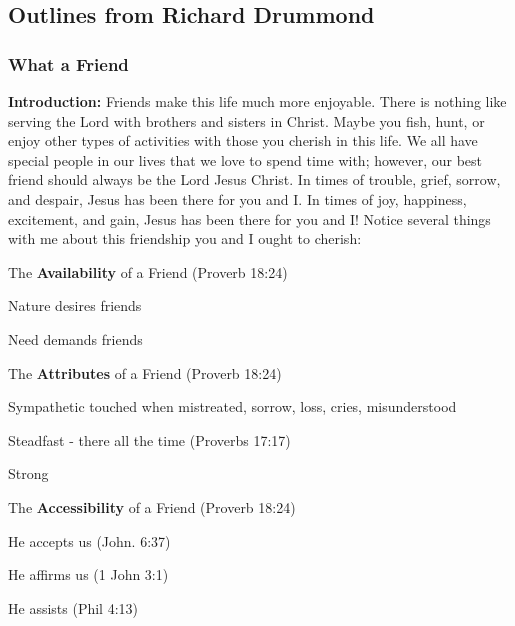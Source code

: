 \subsection{Outlines from Richard Drummond}

\subsubsection{What a Friend}


\noindent \textbf{Introduction: } Friends make this life much more enjoyable. There is nothing like serving the Lord with brothers and sisters in Christ. Maybe you fish, hunt, or enjoy other types of activities with those you cherish in this life. We all have special people in our lives that we love to spend time with; however, our best friend should always be the Lord Jesus Christ. In times of trouble, grief, sorrow, and despair, Jesus has been there for you and I. In times of joy, happiness, excitement, and gain, Jesus has been there for you and I!
Notice several things with me about this friendship you and I ought to cherish:
%
\begin{compactenum}[I.]
    \item The \textbf{Availability} of a Friend (Proverb 18:24)
    \begin{compactenum}[A.]
    	\item Nature desires friends
    	\item Need demands friends
    \end{compactenum}
    \item The \textbf{Attributes} of a Friend (Proverb 18:24)
    \begin{compactenum}[A.]
    	\item Sympathetic touched when mistreated, sorrow, loss, cries, misunderstood
    	\item Steadfast - there all the time  (Proverbs 17:17)
    	\item Strong
    \end{compactenum}
    \item The \textbf{Accessibility} of a Friend (Proverb 18:24)    \begin{compactenum}[A.]
    	\item He accepts us  (John. 6:37)
    	\item He affirms us  (1 John 3:1)
    	\item He assists  (Phil 4:13)
    \end{compactenum}
\end{compactenum}





